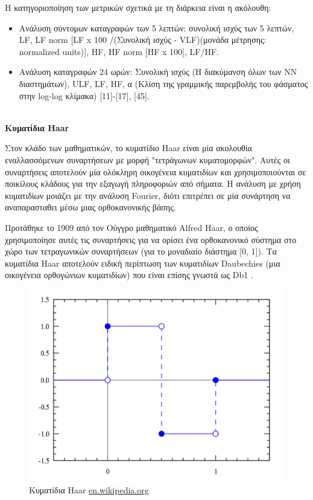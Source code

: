 Η κατηγοριοποίηση των μετρικών σχετικά με τη διάρκεια είναι η ακόλουθη:
\begin{itemize}
	\item Ανάλυση σύντομων καταγραφών των 5 λεπτών: συνολική ισχύς των 5 λεπτών, \en LF, LF norm [LF x 100 /(\gr Συνολική ισχύς - \en VLF)\gr (μονάδα μέτρησης: \en normalized units)], HF, HF norm [HF x 100], LF/HF. \gr
	\item Ανάλυση καταγραφών 24 ωρών: Συνολική ισχύς (Η διακύμανση όλων των ΝΝ διαστημάτων), \en ULF, LF, HF, \gr α (Κλίση της γραμμικής παρεμβολής του φάσματος στην \en log-log \gr  κλίμακα) [11]-[17], [45].
\end{itemize}
\par
\textbf{\\ Kυματίδια \en Haar \gr}
\par
Στον κλάδο των μαθηματικών, το κυματίδιο \en Haar \gr είναι μία ακολουθία εναλλασσόμενων συναρτήσεων με μορφή "τετράγωνων κυματομορφών". Αυτές οι συναρτήσεις αποτελούν μία ολόκληρη οικογένεια κυματιδίων και χρησιμοποιούνται σε ποικίλους κλάδους για την εξαγωγή πληροφοριών από σήματα. Η ανάλυση με χρήση κυματιδίων μοιάζει με την ανάλυση \en Fourier, \gr διότι επιτρέπει  σε μία συνάρτηση να αναπαρασταθει μέσω μιας ορθοκανονικής βάσης. 
\par
Προτάθηκε το 1909 από τον Ούγγρο μαθηματικό \en Alfred Haar, \gr  ο οποίος χρησιμοποίησε αυτές τις συναρτήσεις για να ορίσει ένα ορθοκανονικό σύστημα στο χώρο των τετραγωνικών συναρτήσεων (για το μοναδιαίο διάστημα [0, 1]). Τα κυματίδια \en Haar \gr αποτελούν ειδική περίπτωση των κυματιδίων \en Daubechies \gr (μια οικογένεια ορθογώνιων κυματιδίων) που είναι επίσης γνωστά ως \en Db1 \gr.
\par
\begin{figure}[!ht]
	\centering
	\includegraphics[scale = 0.2]{haar.png}    
	\caption{\gr Κυματίδια \en Haar \protect\url{en.wikipedia.org} \gr}
\end{figure}
